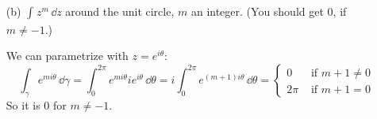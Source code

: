 \documentclass{article}
\begin{document}
\begin{itemize}
        \item [(b)] $\int_{}^{} z^{m} \, \dd{z} $ around the unit circle, $m$ an integer. (You should get $0$, if $m \neq -1$.) 
            \begin{answer}
                We can parametrize with $z = e^{i\theta}$:
                    \begin{equation*}
                        \int_{\gamma}^{} e^{mi\theta} \, \dd{\gamma}  = \int_{0}^{2\pi} e^{mi\theta}ie^{i\theta} \, \dd{\theta} = i \int_{0}^{2\pi} e^{(m + 1)i\theta} \, \dd{\theta} = \begin{cases}
                            0         &\text{ if } m + 1 \neq 0 \\
                            2\pi &\text{ if } m + 1 = 0   
                        \end{cases}
                    \end{equation*}
                So it is $0$ for $m \neq -1$.
            \end{answer}
    \end{itemize}

\newpage
\end{document}
